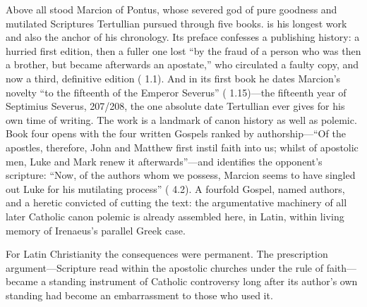 Above all stood Marcion of Pontus, whose severed god of pure goodness and
mutilated Scriptures Tertullian pursued through five books.  is his longest work and also the anchor of his chronology. Its
preface confesses a publishing history: a hurried first edition, then a fuller
one lost ``by the fraud of a person who was then a brother, but became
afterwards an apostate,'' who circulated a faulty copy, and now a third,
definitive edition ( 1.1). And in its first book he
dates Marcion's novelty ``to the fifteenth of the Emperor Severus''
( 1.15)---the fifteenth year of Septimius Severus,
207/208, the one absolute date Tertullian ever gives for his own time of
writing. The work is a landmark of canon history as well as polemic. Book
four opens with the four written Gospels ranked by authorship---``Of the
apostles, therefore, John and Matthew first instil faith into us; whilst of
apostolic men, Luke and Mark renew it afterwards''---and identifies the
opponent's scripture: ``Now, of the authors whom we possess, Marcion seems to
have singled out Luke for his mutilating process'' (
4.2). A fourfold Gospel, named authors, and a heretic convicted of cutting
the text: the argumentative machinery of all later Catholic canon polemic is
already assembled here, in Latin, within living memory of Irenaeus's parallel
Greek case.


For Latin Christianity the consequences were permanent. The prescription
argument---Scripture read within the apostolic churches under the rule of
faith---became a standing instrument of Catholic controversy long after its author's
own standing had become an embarrassment to those who used it.
